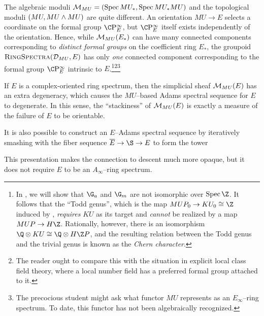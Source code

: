 \begin{remark}\label{MUstarVsMUAsModuli}
The algebraic moduli \(\mathcal{M}_{MU} = (\operatorname{Spec} MU_*, \operatorname{Spec} MU_* MU)\) and the topological moduli \((MU, MU \wedge MU)\) are quite different.  An orientation \(MU \to E\) selects a coordinate on the formal group \(\CP^\infty_E\), but \(\CP^\infty_E\) itself exists independently of the orientation.  Hence, while \(\mathcal{M}_{MU}(E_*)\) can have many connected components corresponding to \emph{distinct formal groups} on the coefficient ring \(E_*\), the groupoid \(\normalfont\textsc{RingSpectra}(\mathcal{D}_{MU}, E)\) has only \emph{one} connected component corresponding to the formal group \(\CP^\infty_E\) intrinsic to \(E\).\footnote{In , we will show that \(\G_a\) and \(\G_m\) are not isomorphic over \(\Spec \Z\).  It follows that the ``Todd genus'', which is the map \(MUP_0 \to KU_0 \cong \Z\) induced by , \emph{requires} \(KU\) as its target and \emph{cannot} be realized by a map \(MUP \to H\Z\).  Rationally, however, there is an isomorphism \(\Q \otimes KU \cong \Q \otimes H\Z P\), and the resulting relation between the Todd genus and the trivial genus is known as the \textit{Chern character}.}\footnote{The reader ought to compare this with the situation in explicit local class field theory, where a local number field has a preferred formal group attached to it.}\footnote{The precocious student might ask what functor \(MU\) represents as an \(E_\infty\)--ring spectrum.  To date, this functor has not been algebraically recognized.}
\end{remark}

\begin{remark}\label{StackinessMeasuresNonorientability}
If \(E\) is a complex-oriented ring spectrum, then the simplicial sheaf \(\mathcal{M}_{MU}(E)\) has an extra degeneracy, which causes the \(MU\)--based Adams spectral sequence for \(E\) to degenerate.  In this sense, the ``stackiness'' of \(\mathcal{M}_{MU}(E)\) is exactly a measure of the failure of \(E\) to be orientable.
\end{remark}

\begin{remark}
It is also possible to construct an \(E\)--Adams spectral sequence by iteratively smashing with the fiber sequence \(\overline E \to \S \to E\) to form the tower
\begin{center}
\end{center}
This presentation makes the connection to descent much more opaque, but it does not require \(E\) to be an \(A_\infty\)--ring spectrum.
\end{remark}

